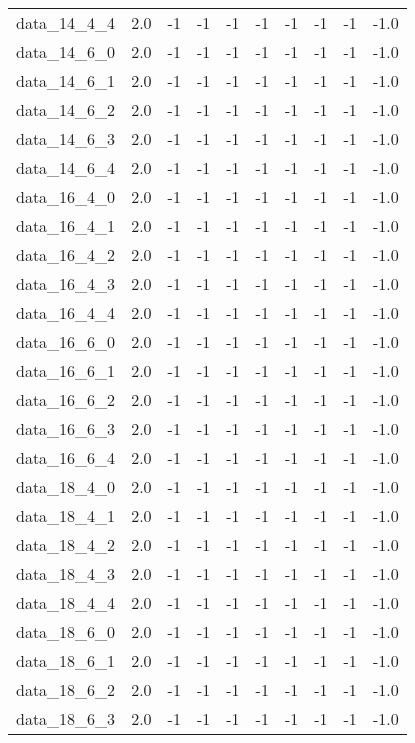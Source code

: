 \begin{tabular}{rrrrrrrrrr}
  data\_14\_4\_4 & 2.0 & -1 & -1 & -1 & -1 & -1 & -1 & -1 & -1.0 \\
  data\_14\_6\_0 & 2.0 & -1 & -1 & -1 & -1 & -1 & -1 & -1 & -1.0 \\
  data\_14\_6\_1 & 2.0 & -1 & -1 & -1 & -1 & -1 & -1 & -1 & -1.0 \\
  data\_14\_6\_2 & 2.0 & -1 & -1 & -1 & -1 & -1 & -1 & -1 & -1.0 \\
  data\_14\_6\_3 & 2.0 & -1 & -1 & -1 & -1 & -1 & -1 & -1 & -1.0 \\
  data\_14\_6\_4 & 2.0 & -1 & -1 & -1 & -1 & -1 & -1 & -1 & -1.0 \\
  data\_16\_4\_0 & 2.0 & -1 & -1 & -1 & -1 & -1 & -1 & -1 & -1.0 \\
  data\_16\_4\_1 & 2.0 & -1 & -1 & -1 & -1 & -1 & -1 & -1 & -1.0 \\
  data\_16\_4\_2 & 2.0 & -1 & -1 & -1 & -1 & -1 & -1 & -1 & -1.0 \\
  data\_16\_4\_3 & 2.0 & -1 & -1 & -1 & -1 & -1 & -1 & -1 & -1.0 \\
  data\_16\_4\_4 & 2.0 & -1 & -1 & -1 & -1 & -1 & -1 & -1 & -1.0 \\
  data\_16\_6\_0 & 2.0 & -1 & -1 & -1 & -1 & -1 & -1 & -1 & -1.0 \\
  data\_16\_6\_1 & 2.0 & -1 & -1 & -1 & -1 & -1 & -1 & -1 & -1.0 \\
  data\_16\_6\_2 & 2.0 & -1 & -1 & -1 & -1 & -1 & -1 & -1 & -1.0 \\
  data\_16\_6\_3 & 2.0 & -1 & -1 & -1 & -1 & -1 & -1 & -1 & -1.0 \\
  data\_16\_6\_4 & 2.0 & -1 & -1 & -1 & -1 & -1 & -1 & -1 & -1.0 \\
  data\_18\_4\_0 & 2.0 & -1 & -1 & -1 & -1 & -1 & -1 & -1 & -1.0 \\
  data\_18\_4\_1 & 2.0 & -1 & -1 & -1 & -1 & -1 & -1 & -1 & -1.0 \\
  data\_18\_4\_2 & 2.0 & -1 & -1 & -1 & -1 & -1 & -1 & -1 & -1.0 \\
  data\_18\_4\_3 & 2.0 & -1 & -1 & -1 & -1 & -1 & -1 & -1 & -1.0 \\
  data\_18\_4\_4 & 2.0 & -1 & -1 & -1 & -1 & -1 & -1 & -1 & -1.0 \\
  data\_18\_6\_0 & 2.0 & -1 & -1 & -1 & -1 & -1 & -1 & -1 & -1.0 \\
  data\_18\_6\_1 & 2.0 & -1 & -1 & -1 & -1 & -1 & -1 & -1 & -1.0 \\
  data\_18\_6\_2 & 2.0 & -1 & -1 & -1 & -1 & -1 & -1 & -1 & -1.0 \\
  data\_18\_6\_3 & 2.0 & -1 & -1 & -1 & -1 & -1 & -1 & -1 & -1.0 \\

\end{tabular}
